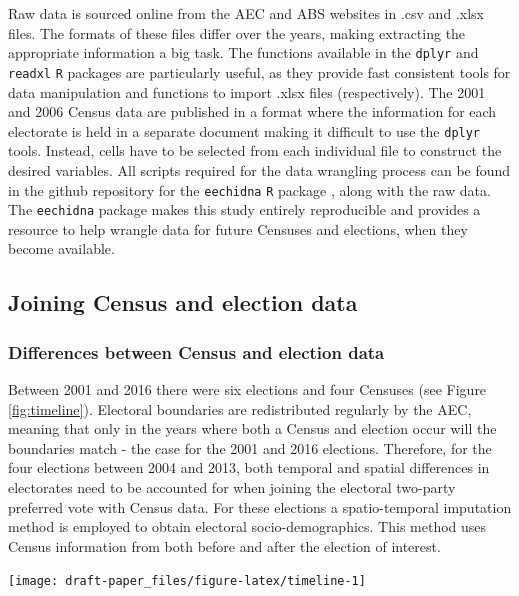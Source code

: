 \documentclass[11pt,a4paper,]{article}
\let\origfigure\figure
\let\endorigfigure\endfigure
\renewenvironment{figure}[1][2] {
    \expandafter\origfigure\expandafter[H]
} {
    \endorigfigure
}
\begin{document}
Raw data is sourced online from the AEC and ABS websites in .csv and .xlsx files. The formats of these files differ over the years, making extracting the appropriate information a big task. The functions available in the \texttt{dplyr} \autocite{dplyr} and \texttt{readxl} \autocite{readxl} \texttt{R} packages are particularly useful, as they provide fast consistent tools for data manipulation and functions to import .xlsx files (respectively). The 2001 and 2006 Census data are published in a format where the information for each electorate is held in a separate document making it difficult to use the \texttt{dplyr} tools. Instead, cells have to be selected from each individual file to construct the desired variables. All scripts required for the data wrangling process can be found in the github repository for the \texttt{eechidna} \texttt{R} package \autocite{eechidna}, along with the raw data. The \texttt{eechidna} package makes this study entirely reproducible and provides a resource to help wrangle data for future Censuses and elections, when they become available.

\hypertarget{joining-census-and-election-data}{%
\subsection{Joining Census and election data}\label{joining-census-and-election-data}}

\hypertarget{differences-between-census-and-election-data}{%
\subsubsection{Differences between Census and election data}\label{differences-between-census-and-election-data}}

Between 2001 and 2016 there were six elections and four Censuses (see Figure \ref{fig:timeline}). Electoral boundaries are redistributed regularly by the AEC, meaning that only in the years where both a Census and election occur will the boundaries match - the case for the 2001 and 2016 elections. Therefore, for the four elections between 2004 and 2013, both temporal and spatial differences in electorates need to be accounted for when joining the electoral two-party preferred vote with Census data. For these elections a spatio-temporal imputation method is employed to obtain electoral socio-demographics. This method uses Census information from both before and after the election of interest.

\begin{figure}[h]

{\centering \texttt{[image: draft-paper\_files/figure-latex/timeline-1]} 

}

\caption{Timeline of Australian elections and Censuses. They do not always occur in the same year.}\label{fig:timeline}
\end{figure}
\end{document}
